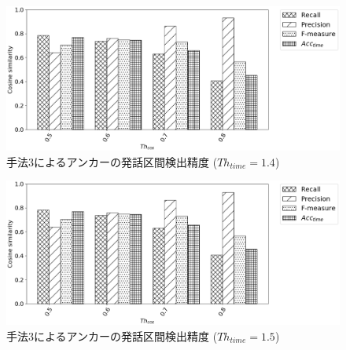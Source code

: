\begin{figure}[H]
  \begin{center}
    \includegraphics[scale=0.5]{./figure/prob3_14.eps}
  \end{center}
  \caption{手法3によるアンカーの発話区間検出精度 ($Th_{time}=1.4$)}
\end{figure}

\begin{figure}[H]
  \begin{center}
    \includegraphics[scale=0.5]{./figure/prob3_15.eps}
  \end{center}
  \caption{手法3によるアンカーの発話区間検出精度 ($Th_{time}=1.5$)}
\end{figure}